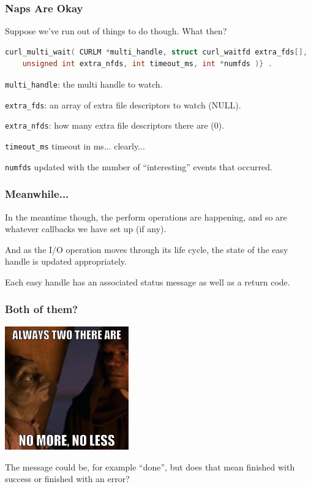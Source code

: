 \begin{frame}[fragile]
	\frametitle{Naps Are Okay}

	Suppose we've run out of things to do though. What then?

	\begin{lstlisting}[language=C]
curl_multi_wait( CURLM *multi_handle, struct curl_waitfd extra_fds[], 
    unsigned int extra_nfds, int timeout_ms, int *numfds )} . 
\end{lstlisting}

	\texttt{multi\_handle}: the multi handle to watch.

	\texttt{extra\_fds}: an array of extra file descriptors to watch (NULL).

	\texttt{extra\_nfds}: how many extra file descriptors there are (0).

	\texttt{timeout\_ms} timeout in ms... clearly...

	\texttt{numfds} updated with the number of ``interesting'' events that occurred.

\end{frame}

\begin{frame}
	\frametitle{Meanwhile...}

	In the meantime though, the perform operations are happening, and so are whatever callbacks we have set up (if any).

	And as the I/O operation moves through its life cycle, the state of the easy handle is updated appropriately.

	Each easy handle has an associated status message as well as a return code.


\end{frame}


\begin{frame}
	\frametitle{Both of them?}
	\begin{center}
		\includegraphics[width=0.4\textwidth]{images/yoda-two.jpg}
	\end{center}

	The message could be, for example ``done'', but does that mean finished with success or finished with an error?
\end{frame}


